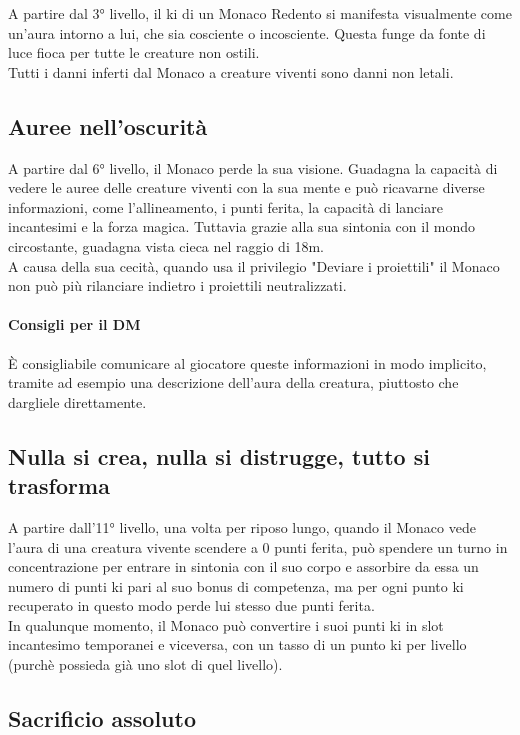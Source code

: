 A partire dal 3° livello, il ki di un Monaco Redento si manifesta visualmente come un'aura intorno a lui, che sia cosciente o incosciente. Questa funge da fonte di luce fioca per tutte le creature non ostili. \\ Tutti i danni inferti dal Monaco a creature viventi sono danni non letali.

\subsection{Auree nell'oscurità}

A partire dal 6° livello, il Monaco perde la sua visione. Guadagna la capacità di vedere le auree delle creature viventi con la sua mente e può ricavarne diverse informazioni, come l'allineamento, i punti ferita, la capacità di lanciare incantesimi e la forza magica. Tuttavia grazie alla sua sintonia con il mondo circostante, guadagna vista cieca nel raggio di 18m. \\ A causa della sua cecità, quando usa il privilegio "Deviare i proiettili" il Monaco non può più rilanciare indietro i proiettili neutralizzati.
\paragraph{Consigli per il DM}È consigliabile comunicare al giocatore queste informazioni in modo implicito, tramite ad esempio una descrizione dell'aura della creatura, piuttosto che dargliele direttamente.

\subsection{Nulla si crea, nulla si distrugge, tutto si trasforma}

A partire dall'11° livello, una volta per riposo lungo, quando il Monaco vede l'aura di una creatura vivente scendere a 0 punti ferita, può spendere un turno in concentrazione per entrare in sintonia con il suo corpo e assorbire da essa un numero di punti ki pari al suo bonus di competenza, ma per ogni punto ki recuperato in questo modo perde lui stesso due punti ferita. \\ In qualunque momento, il Monaco può convertire i suoi punti ki in slot incantesimo temporanei e viceversa, con un tasso di un punto ki per livello (purchè possieda già uno slot di quel livello).

\subsection{Sacrificio assoluto}

